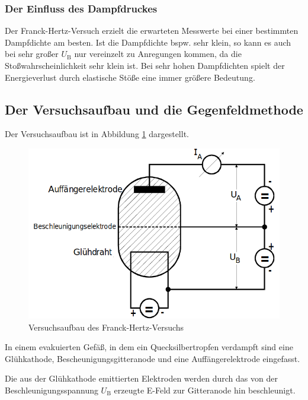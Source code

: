 \subsubsection{Der Einfluss des Dampfdruckes}

Der Franck-Hertz-Versuch erzielt die erwarteten Messwerte bei einer bestimmten Dampfdichte am besten.
Ist die Dampfdichte bspw. sehr klein, so kann es auch bei sehr großer $U_\text{B}$ nur vereinzelt
zu Anregungen kommen, da die Stoßwahrscheinlichkeit sehr klein ist. Bei sehr hohen Dampfdichten 
spielt der Energieverlust durch elastische Stöße eine immer größere Bedeutung.



\subsection{Der Versuchsaufbau und die Gegenfeldmethode}

Der Versuchsaufbau ist in Abbildung \ref{fig:bild1} dargestellt.

\begin{figure} [H]
    \centering
    \includegraphics{content/bild1.png}
    \caption{Versuchsaufbau des Franck-Hertz-Versuchs}
    \label{fig:bild1}
  \end{figure}

In einem evakuierten Gefäß, in dem ein Quecksilbertropfen verdampft sind
eine Glühkathode, Bescheunigungsgitteranode und eine Auffängerelektrode eingefasst.

Die aus der Glühkathode emittierten Elektroden werden durch das von der
Beschleunigungsspannung $U_\text{B}$ erzeugte E-Feld zur Gitteranode hin
beschleunigt.

